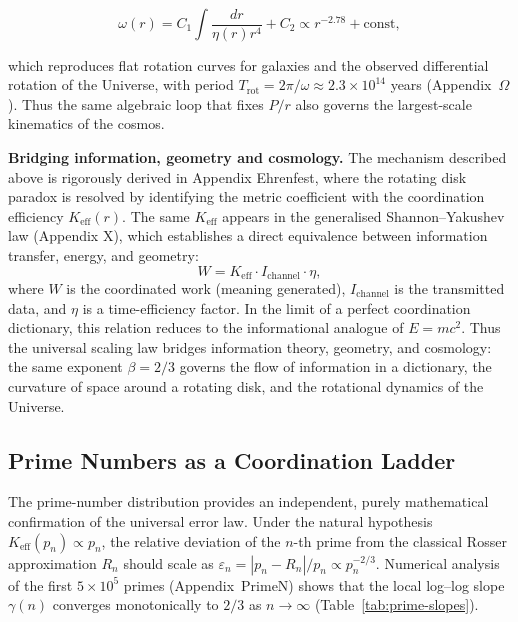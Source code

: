 \documentclass[12pt]{article}
\begin{document}
	\begin{equation}
		\omega(r) = C_1 \int \frac{dr}{\eta(r) r^4} + C_2 \propto r^{-2.78} + \text{const},
	\end{equation}
	
	which reproduces flat rotation curves for galaxies and the observed differential rotation of the Universe, with period \(T_{\mathrm{rot}} = 2\pi/\omega \approx 2.3\times10^{14}\) years (Appendix~\(\Omega\)). Thus the same algebraic loop that fixes \(P/r\) also governs the largest-scale kinematics of the cosmos.
	
	\textbf{Bridging information, geometry and cosmology.}
	The mechanism described above is rigorously derived in Appendix Ehrenfest, where the rotating disk paradox is resolved by identifying the metric coefficient with the coordination efficiency \(K_{\mathrm{eff}}(r)\). The same \(K_{\mathrm{eff}}\) appears in the generalised Shannon–Yakushev law (Appendix X), which establishes a direct equivalence between information transfer, energy, and geometry:
	\begin{equation}
		W = K_{\mathrm{eff}} \cdot I_{\text{channel}} \cdot \eta,
	\end{equation}
	where \(W\) is the coordinated work (meaning generated), \(I_{\text{channel}}\) is the transmitted data, and \(\eta\) is a time-efficiency factor. In the limit of a perfect coordination dictionary, this relation reduces to the informational analogue of \(E = mc^2\). Thus the universal scaling law bridges information theory, geometry, and cosmology: the same exponent \(\beta = 2/3\) governs the flow of information in a dictionary, the curvature of space around a rotating disk, and the rotational dynamics of the Universe.
	
	\subsection{Prime Numbers as a Coordination Ladder}
	
	The prime-number distribution provides an independent, purely mathematical confirmation of the universal error law. Under the natural hypothesis \(K_{\mathrm{eff}}(p_n) \propto p_n\), the relative deviation of the \(n\)-th prime from the classical Rosser approximation \(R_n\) should scale as \(\varepsilon_n = |p_n - R_n|/p_n \propto p_n^{-2/3}\). Numerical analysis of the first \(5\times10^5\) primes (Appendix~PrimeN) shows that the local log--log slope \(\gamma(n)\) converges monotonically to \(2/3\) as \(n\to\infty\) (Table~\ref{tab:prime-slopes}).
	
\end{document}
